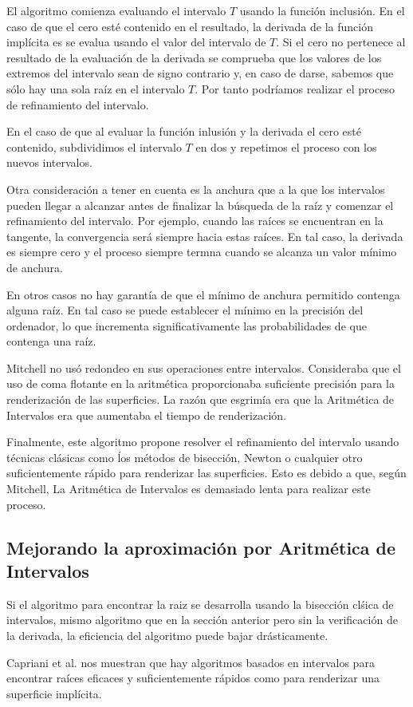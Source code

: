 El algoritmo comienza evaluando el intervalo $T$ usando la función inclusión. En el caso de que el cero esté contenido en el resultado, la derivada de la función implícita es se evalua usando el valor del intervalo de $T$. Si el cero no pertenece al resultado de la evaluación de la derivada se comprueba que los valores de los extremos del intervalo sean de signo contrario y, en caso de darse, sabemos que sólo hay una sola raíz en el intervalo $T$. Por tanto podríamos realizar el proceso de refinamiento del intervalo.
\par En el caso de que al evaluar la función inlusión y la derivada el cero esté contenido, subdividimos el intervalo $T$ en dos y repetimos el proceso con los nuevos intervalos.
\par Otra consideración a tener en cuenta es la anchura que a la que los intervalos pueden llegar a alcanzar antes de finalizar la búsqueda de la raíz y comenzar el refinamiento del intervalo. Por ejemplo, cuando las raíces se encuentran en la tangente, la convergencia será siempre hacia estas raíces. En tal caso, la derivada es siempre cero y el proceso siempre termna cuando se alcanza un valor mínimo de anchura.
\par En otros casos no hay garantía de que el mínimo de anchura permitido contenga alguna raíz. En tal caso se puede establecer el mínimo en la precisión del ordenador, lo que incrementa significativamente las probabilidades de que contenga una raíz. \cite{Capriani00}
\par Mitchell no usó redondeo en sus operaciones entre intervalos. Consideraba que el uso de coma flotante en la aritmética proporcionaba suficiente precisión para la renderización de las superficies. La razón que esgrimía era que la Aritmética de Intervalos era que aumentaba el tiempo de renderización.
\par Finalmente, este algoritmo propone resolver el refinamiento del intervalo usando técnicas clásicas como ĺos métodos de bisección, Newton o cualquier otro suficientemente rápido para renderizar las superficies. Esto es debido a que, según Mitchell, La Aritmética de Intervalos es demasiado lenta para realizar este proceso.

\subsection{Mejorando la aproximación por Aritmética de Intervalos}

Si el algoritmo para encontrar la raiz se desarrolla usando la bisección clśica de intervalos, mismo algoritmo que en la sección anterior pero sin la verificación de la derivada, la eficiencia del algoritmo puede bajar drásticamente.
\par Capriani et al. \cite{Capriani00} nos muestran que hay algoritmos basados en intervalos para encontrar raíces eficaces y suficientemente rápidos como para renderizar una superficie implícita.


